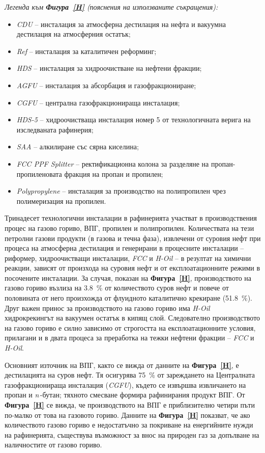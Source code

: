 \noindent\textit{Легенда към \textbf{Фигура~\ref{H}} (пояснения на използваните съкращения):}
\begin{itemize}\setlength{\itemsep}{0pt}\setlength{\parskip}{0pt}
	\item \textit{CDU} -- инсталация за атмосферна дестилация на нефта и вакуумна дестилация на атмосферния остатък;
	\item \textit{Ref} -- инсталация за каталитичен реформинг;
	\item \textit{HDS} -- инсталация за хидроочистване на нефтени фракции;
	\item \textit{AGFU} -- инсталация за абсорбация и газофракциониране;
	\item \textit{CGFU} -- централна газофракционираща инсталация;
	\item \textit{HDS-5} -- хидроочистваща инсталация номер 5 от технологичната верига на изследваната рафинерия;
	\item \textit{SAA} -- алкилиране със сярна киселина;
	\item \textit{FCC PPF Splitter} -- ректификационна колона за разделяне на пропан-пропиленовата фракция на пропан и пропилен;
	\item \textit{Polypropylene} -- инсталация за производство на полипропилен чрез полимеризация на пропилен.
\end{itemize}

Тринадесет технологични инсталации в рафинерията участват в производствения процес на газово гориво, ВПГ, пропилен и полипропилен. Количествата на тези петролни газови продукти (в газова и течна фаза), извлечени от суровия нефт при процеса на атмосферна дестилация и генерирани в процесните инсталации -- риформер, хидроочистващи инсталации, \textit{FCC} и \textit{H-Oil} -- в резултат на химични реакции, зависят от произхода на суровия нефт и от експлоатационните режими в посочените инсталации. За случая, показан на \textbf{Фигура~\ref{H}}, производството на газово гориво възлиза на 3.8~\% от количеството суров нефт и повече от половината от него произхожда от флуидното каталитично крекиране (51.8~\%). Друг важен принос за производството на газово гориво има \textit{H-Oil} хидрокрекингът на вакуумен остатък в кипящ слой. Следователно производството на газово гориво е силно зависимо от строгостта на експлоатационните условия, прилагани и в двата процеса за преработка на тежки нефтени фракции -- \textit{FCC} и \textit{H-Oil}. 

Основният източник на ВПГ, както се вижда от данните на \textbf{Фигура~\ref{H}}, е дестилацията на суров нефт. Тя осигурява 75~\% от зареждането на Централната газофракционираща инсталация (\textit{CGFU}), където се извършва извличането на пропан и \textit{n}\,-бутан; тяхното смесване формира рафинирания продукт ВПГ. От \textbf{Фигура~\ref{H}} се вижда, че производството на ВПГ е приблизително четири пъти по-малко от това на газовото гориво. Данните на \textbf{Фигура~\ref{H}} показват, че ако количеството газово гориво е недостатъчно за покриване на енергийните нужди на рафинерията, съществува възможност за внос на природен газ за допълване на наличностите от газово гориво. 

